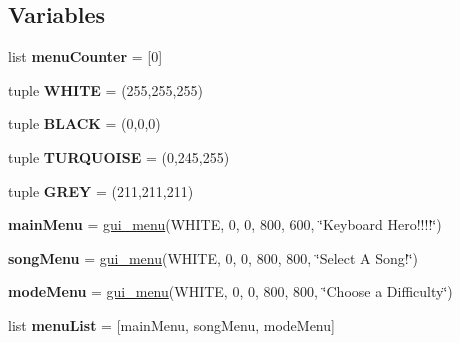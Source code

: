 \subsection*{Variables}
\begin{DoxyCompactItemize}
\item 
\mbox{\label{namespacegame_menus_a11ef9beb0d7eff2ed4bb237e09882810}} 
list {\bfseries menu\+Counter} = \mbox{[}0\mbox{]}
\item 
\mbox{\label{namespacegame_menus_a437ece1871ff002097bc5825c5f35ba9}} 
tuple {\bfseries W\+H\+I\+TE} = (255,255,255)
\item 
\mbox{\label{namespacegame_menus_a63c6d393e7926ac50fee896f0a0fe2e1}} 
tuple {\bfseries B\+L\+A\+CK} = (0,0,0)
\item 
\mbox{\label{namespacegame_menus_abd649778f640f3d13ecac6c00e84f6cb}} 
tuple {\bfseries T\+U\+R\+Q\+U\+O\+I\+SE} = (0,245,255)
\item 
\mbox{\label{namespacegame_menus_a12a163ccb40ab4980731077742bec4c5}} 
tuple {\bfseries G\+R\+EY} = (211,211,211)
\item 
\mbox{\label{namespacegame_menus_af074ca0237d16dd092c9eb84ca758189}} 
{\bfseries main\+Menu} = \hyperlink{class_menu_1_1gui__menu}{gui\+\_\+menu}(W\+H\+I\+TE, 0, 0, 800, 600, \char`\"{}Keyboard Hero!!!!\char`\"{})
\item 
\mbox{\label{namespacegame_menus_abfd4e200d341aba89c738b2da78fe04a}} 
{\bfseries song\+Menu} = \hyperlink{class_menu_1_1gui__menu}{gui\+\_\+menu}(W\+H\+I\+TE, 0, 0, 800, 800, \char`\"{}Select A Song!\char`\"{})
\item 
\mbox{\label{namespacegame_menus_a00d1a48bad9811a1042b89f061b7588a}} 
{\bfseries mode\+Menu} = \hyperlink{class_menu_1_1gui__menu}{gui\+\_\+menu}(W\+H\+I\+TE, 0, 0, 800, 800, \char`\"{}Choose a Difficulty\char`\"{})
\item 
\mbox{\label{namespacegame_menus_abe492014847d1ea98eca11626c878c72}} 
list {\bfseries menu\+List} = \mbox{[}main\+Menu, song\+Menu, mode\+Menu\mbox{]}
\end{DoxyCompactItemize}


